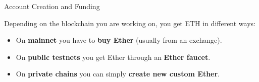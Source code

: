 \documentclass[]{beamer}
\begin{document}


\begin{frame}{Account Creation and Funding}
	
	Depending on the blockchain you are working on, you get ETH in different ways:\\
	
	\begin{itemize}
		\item<1-> On \textbf{mainnet} you have to \textbf{buy Ether}	 (usually from an exchange).
		\item<2-> On \textbf{public testnets} you get Ether through an \textbf{Ether faucet}.
		\item<3-> On \textbf{private chains} you can simply \textbf{create new custom Ether}.
	\end{itemize}
	\vspace{1em}
\end{frame}

\end{document}
